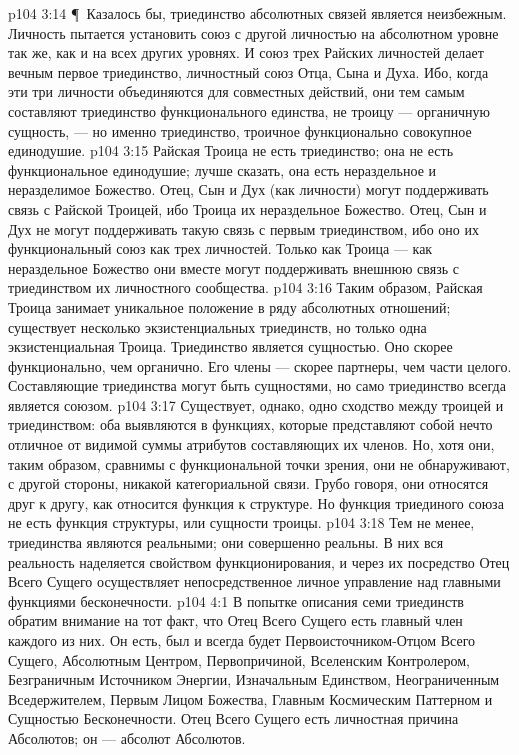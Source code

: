 \vs p104 3:14 \P\ Казалось бы, триединство абсолютных связей является неизбежным. Личность пытается установить союз с другой личностью на абсолютном уровне так же, как и на всех других уровнях. И союз трех Райских личностей делает вечным первое триединство, личностный союз Отца, Сына и Духа. Ибо, когда эти три личности объединяются  для совместных действий, они тем самым составляют триединство функционального единства, не троицу --- органичную сущность, --- но именно триединство, троичное функционально совокупное единодушие.
\vs p104 3:15 Райская Троица не есть триединство; она не есть функциональное единодушие; лучше сказать, она есть нераздельное и неразделимое Божество. Отец, Сын и Дух (как личности) могут поддерживать связь с Райской Троицей, ибо Троица  их нераздельное Божество. Отец, Сын и Дух не могут поддерживать такую связь с первым триединством, ибо оно  их функциональный союз как трех личностей. Только как Троица --- как нераздельное Божество они вместе могут поддерживать внешнюю связь с триединством их личностного сообщества.
\vs p104 3:16 Таким образом, Райская Троица занимает уникальное положение в ряду абсолютных отношений; существует несколько экзистенциальных триединств, но только одна экзистенциальная Троица. Триединство  является сущностью. Оно скорее функционально, чем органично. Его члены --- скорее партнеры, чем части целого. Составляющие триединства могут быть сущностями, но само триединство всегда является союзом.
\vs p104 3:17 Существует, однако, одно сходство между троицей и триединством: оба выявляются в функциях, которые представляют собой нечто отличное от видимой суммы атрибутов составляющих их членов. Но, хотя они, таким образом, сравнимы с функциональной точки зрения, они не обнаруживают, с другой стороны, никакой категориальной связи. Грубо говоря, они относятся друг к другу, как относится функция к структуре. Но функция триединого союза не есть функция структуры, или сущности троицы.
\vs p104 3:18 Тем не менее, триединства являются реальными; они совершенно реальны. В них вся реальность наделяется свойством функционирования, и через их посредство Отец Всего Сущего осуществляет непосредственное личное управление над главными функциями бесконечности.
\vs p104 4:1 В попытке описания семи триединств обратим внимание на тот факт, что Отец Всего Сущего есть главный член каждого из них. Он есть, был и всегда будет Первоисточником\hyp{}Отцом Всего Сущего, Абсолютным Центром, Первопричиной, Вселенским Контролером, Безграничным Источником Энергии, Изначальным Единством, Неограниченным Вседержителем, Первым Лицом Божества, Главным Космическим Паттерном и Сущностью Бесконечности. Отец Всего Сущего есть личностная причина Абсолютов; он --- абсолют Абсолютов.
